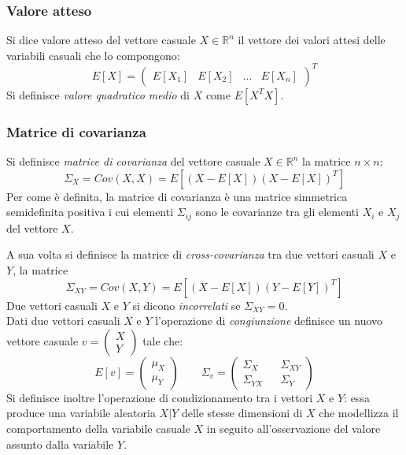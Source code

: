 \subsubsection{Valore atteso}

Si dice valore atteso del vettore casuale $X \in \mathbb{R}^n$ il vettore dei valori attesi delle variabili casuali che lo compongono: 
\begin{equation}
E[X] = \begin{pmatrix}
E[X_1] & E[X_2] & \dots & E[X_n]
\end{pmatrix}^T
\end{equation}
Si definisce \textit{valore quadratico medio} di $X$ come $E[X^T X]$.

\subsubsection{Matrice di covarianza}

Si definisce \textit{matrice di covarianza} del vettore casuale $X \in \mathbb{R}^n$ la matrice $n \times n$: \begin{equation}
 \Sigma_X = Cov(X, X) = E[(X-E[X])(X-E[X])^T]
\end{equation}
Per come è definita, la matrice di covarianza è una matrice simmetrica semidefinita positiva i cui elementi $\Sigma_{ij}$ sono le covarianze tra gli elementi $X_i$ e $X_j$ del vettore $X$.

A sua volta si definisce la matrice di \textit{cross-covarianza} tra due vettori casuali $X$ e $Y$, la matrice
\begin{equation}
 \Sigma_{XY} = Cov(X, Y) = E[(X-E[X])(Y-E[Y])^T]
\end{equation}
Due vettori casuali $X$ e $Y$ si dicono \textit{incorrelati} se $\Sigma_{XY} = 0$.\\
Dati due vettori casuali $X$ e $Y$ l'operazione di \textit{congiunzione} definisce un nuovo vettore casuale $v=\begin{pmatrix}X \\ Y\end{pmatrix}$ tale che: 
\begin{equation}
E[v]=\begin{pmatrix}\mu_X \\ \mu_Y\end{pmatrix} \qquad \Sigma_v=\begin{pmatrix}\Sigma_X && \Sigma_{XY} \\ \Sigma_{YX} && \Sigma_Y\end{pmatrix}
\end{equation}
Si definisce inoltre l'operazione di condizionamento tra i vettori $X$ e $Y$: essa produce una variabile aleatoria $X|Y$ delle stesse dimensioni di $X$ che modellizza il comportamento della variabile casuale $X$ in seguito all'osservazione del valore assunto dalla variabile $Y$.

